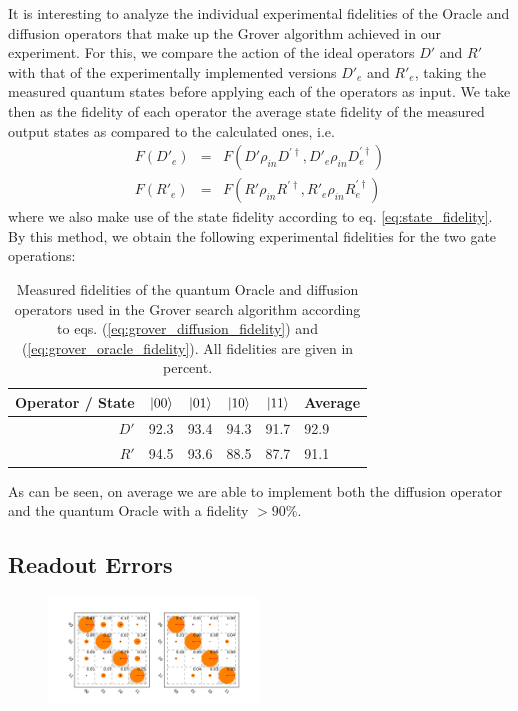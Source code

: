 It is interesting to analyze the individual experimental fidelities of the Oracle and diffusion operators that make up the Grover algorithm achieved in our experiment. For this, we compare the action of the ideal operators $D'$ and $R'$ with that of the experimentally implemented versions $D'_{e}$ and $R'_{e}$, taking the measured quantum states before applying each of the operators as input. We take then as the fidelity of each operator the average state fidelity of the measured output states as compared to the calculated ones, i.e.
%
\begin{eqnarray}
F(D'_{e}) & = & F(D'\rho_{in}D^{'\dagger},D'_e \rho_{in} D_{e}^{'\dagger}) \label{eq:grover_diffusion_fidelity} \\
F(R'_{e}) & = & F(R'\rho_{in}R^{'\dagger},R'_e \rho_{in} R_{e}^{'\dagger}) \label{eq:grover_oracle_fidelity}
\end{eqnarray}
%
where we also make use of the state fidelity according to eq. \ref{eq:state_fidelity}. By this method, we obtain the following experimental fidelities for the two gate operations:

\begin{table}[ht!]
\centering
\begin{tabular}{r|rrrr|l}
Operator / State & $\left| 00 \right>$ & $\left| 01 \right>$ & $\left| 10 \right>$ & $\left| 11 \right>$ & Average \\ \hline 
$D'$ & 92.3 & 93.4 & 94.3 & 91.7 & 92.9 \\
$R'$ & 94.5 & 93.6 & 88.5 & 87.7 & 91.1
\end{tabular}
\caption[Measured fidelities of the quantum Oracle and diffusion operators used in the Grover search algorithm]{Measured fidelities of the quantum Oracle and diffusion operators used in the Grover search algorithm according to eqs. (\ref{eq:grover_diffusion_fidelity}) and (\ref{eq:grover_oracle_fidelity}). All fidelities are given in percent.}
\end{table}

As can be seen, on average we are able to implement both the diffusion operator and the quantum Oracle with a fidelity $>90\%$.
\subsection{Readout Errors}

\begin{figure}
	\centering
\includegraphics[width=0.5\textwidth]{"./data/ct5/2011_04_21 - grover and tomo/good_data/readout only"}
	\caption{}
	\label{fig:GroverReadoutMatrix}
\end{figure}

